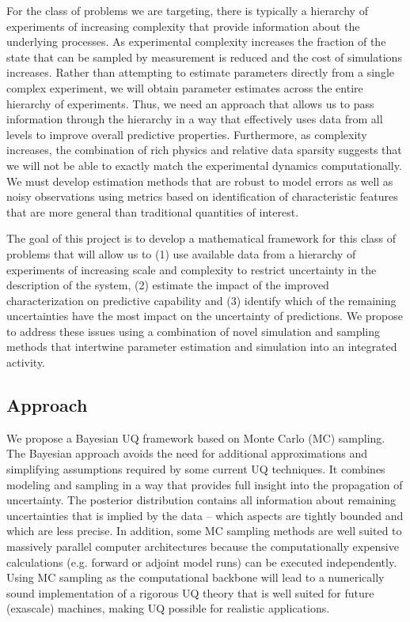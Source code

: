 \documentclass[11pt]{article}
\newcommand{\MarginPar}[1]{\marginpar{%
\vskip-\baselineskip %
\raggedright\tiny\sffamily
\hrule\smallskip{\color{red}#1}\par\smallskip\hrule}}
\begin{document}
For the class of problems we are targeting, there is typically a 
hierarchy
of experiments of increasing complexity that provide information about the underlying processes.
As experimental complexity increases the fraction of the state that can be sampled
by measurement is reduced and the cost of simulations increases.
Rather than attempting to estimate parameters directly from a single complex experiment, we 
will obtain parameter estimates across the entire hierarchy of experiments.
Thus, we need an approach that allows us to pass
information through the hierarchy in a way that effectively uses data from all levels
to improve overall predictive properties.
Furthermore, as complexity increases,
the combination of rich physics and relative data sparsity suggests that we will not be
able to exactly match the experimental dynamics computationally.
We must develop estimation methods that are robust to model errors as well as noisy observations
using metrics based on identification of characteristic features that are more general than
traditional quantities of interest.

The goal of this project is to develop a
mathematical framework for this class of problems that will allow us to (1) use available data from a hierarchy
of experiments of increasing scale and complexity to restrict
uncertainty in the description of the system, (2) estimate the impact of the improved characterization
on predictive capability and (3) identify which of the remaining uncertainties have the most impact
on the uncertainty of predictions.
We propose to address these issues using a combination of novel simulation and sampling methods that
intertwine parameter estimation and simulation into an integrated activity.


\subsection*{Approach}
We propose a Bayesian UQ framework based on Monte Carlo (MC) sampling.
The Bayesian approach avoids the need for additional approximations and simplifying assumptions 
required by some current UQ techniques.
It combines modeling and sampling in a way that provides full insight into the propagation of 
uncertainty.
The posterior distribution contains all information about remaining uncertainties that is implied
by the data -- which aspects are tightly bounded and which are less precise.
In addition, some MC sampling methods are well suited to massively parallel computer architectures because
the computationally expensive calculations
(e.g. forward or adjoint model runs) can be executed independently.
Using MC sampling as the computational backbone will lead to a numerically sound implementation of a rigorous UQ theory
that is well suited for future (exascale) machines, making UQ possible for realistic applications.
\end{document}

